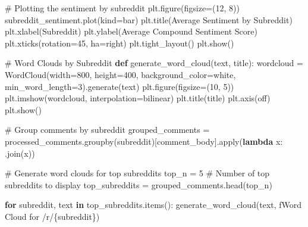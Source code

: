 \documentclass[
  12pt,
  letterpaper,
  DIV=11,
  numbers=noendperiod]{scrartcl}
\newenvironment{Shaded}{\begin{snugshade}}{\end{snugshade}}
\newcommand{\BuiltInTok}[1]{\textcolor[rgb]{0.00,0.23,0.31}{#1}}
\newcommand{\CommentTok}[1]{\textcolor[rgb]{0.37,0.37,0.37}{#1}}
\newcommand{\ControlFlowTok}[1]{\textcolor[rgb]{0.00,0.23,0.31}{\textbf{#1}}}
\newcommand{\DecValTok}[1]{\textcolor[rgb]{0.68,0.00,0.00}{#1}}
\newcommand{\KeywordTok}[1]{\textcolor[rgb]{0.00,0.23,0.31}{\textbf{#1}}}
\newcommand{\NormalTok}[1]{\textcolor[rgb]{0.00,0.23,0.31}{#1}}
\newcommand{\OperatorTok}[1]{\textcolor[rgb]{0.37,0.37,0.37}{#1}}
\newcommand{\SpecialCharTok}[1]{\textcolor[rgb]{0.37,0.37,0.37}{#1}}
\newcommand{\SpecialStringTok}[1]{\textcolor[rgb]{0.13,0.47,0.30}{#1}}
\newcommand{\StringTok}[1]{\textcolor[rgb]{0.13,0.47,0.30}{#1}}
\begin{document}
\begin{Shaded}
\begin{Highlighting}[]
\CommentTok{\# Plotting the sentiment by subreddit}
\NormalTok{plt.figure(figsize}\OperatorTok{=}\NormalTok{(}\DecValTok{12}\NormalTok{, }\DecValTok{8}\NormalTok{))}
\NormalTok{subreddit\_sentiment.plot(kind}\OperatorTok{=}\StringTok{\textquotesingle{}bar\textquotesingle{}}\NormalTok{)}
\NormalTok{plt.title(}\StringTok{\textquotesingle{}Average Sentiment by Subreddit\textquotesingle{}}\NormalTok{)}
\NormalTok{plt.xlabel(}\StringTok{\textquotesingle{}Subreddit\textquotesingle{}}\NormalTok{)}
\NormalTok{plt.ylabel(}\StringTok{\textquotesingle{}Average Compound Sentiment Score\textquotesingle{}}\NormalTok{)}
\NormalTok{plt.xticks(rotation}\OperatorTok{=}\DecValTok{45}\NormalTok{, ha}\OperatorTok{=}\StringTok{\textquotesingle{}right\textquotesingle{}}\NormalTok{)}
\NormalTok{plt.tight\_layout()}
\NormalTok{plt.show()}

\CommentTok{\# Word Clouds by Subreddit}
\KeywordTok{def}\NormalTok{ generate\_word\_cloud(text, title):}
\NormalTok{    wordcloud }\OperatorTok{=}\NormalTok{ WordCloud(width}\OperatorTok{=}\DecValTok{800}\NormalTok{, height}\OperatorTok{=}\DecValTok{400}\NormalTok{, background\_color}\OperatorTok{=}\StringTok{\textquotesingle{}white\textquotesingle{}}\NormalTok{, min\_word\_length}\OperatorTok{=}\DecValTok{3}\NormalTok{).generate(text)}
\NormalTok{    plt.figure(figsize}\OperatorTok{=}\NormalTok{(}\DecValTok{10}\NormalTok{, }\DecValTok{5}\NormalTok{))}
\NormalTok{    plt.imshow(wordcloud, interpolation}\OperatorTok{=}\StringTok{\textquotesingle{}bilinear\textquotesingle{}}\NormalTok{)}
\NormalTok{    plt.title(title)}
\NormalTok{    plt.axis(}\StringTok{\textquotesingle{}off\textquotesingle{}}\NormalTok{)}
\NormalTok{    plt.show()}

\CommentTok{\# Group comments by subreddit}
\NormalTok{grouped\_comments }\OperatorTok{=}\NormalTok{ processed\_comments.groupby(}\StringTok{\textquotesingle{}subreddit\textquotesingle{}}\NormalTok{)[}\StringTok{\textquotesingle{}comment\_body\textquotesingle{}}\NormalTok{].}\BuiltInTok{apply}\NormalTok{(}\KeywordTok{lambda}\NormalTok{ x: }\StringTok{\textquotesingle{} \textquotesingle{}}\NormalTok{.join(x))}

\CommentTok{\# Generate word clouds for top subreddits}
\NormalTok{top\_n }\OperatorTok{=} \DecValTok{5}  \CommentTok{\# Number of top subreddits to display}
\NormalTok{top\_subreddits }\OperatorTok{=}\NormalTok{ grouped\_comments.head(top\_n)}

\ControlFlowTok{for}\NormalTok{ subreddit, text }\KeywordTok{in}\NormalTok{ top\_subreddits.items():}
\NormalTok{    generate\_word\_cloud(text, }\SpecialStringTok{f\textquotesingle{}Word Cloud for /r/}\SpecialCharTok{\{}\NormalTok{subreddit}\SpecialCharTok{\}}\SpecialStringTok{\textquotesingle{}}\NormalTok{)}
\end{Highlighting}
\end{Shaded}
\end{document}

